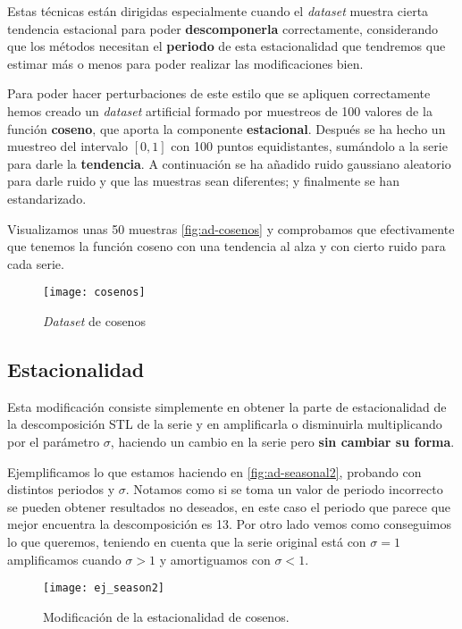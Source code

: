 Estas técnicas están dirigidas especialmente cuando el \emph{dataset} muestra cierta tendencia estacional para poder \textbf{descomponerla} correctamente, considerando que los métodos necesitan el \textbf{periodo} de esta estacionalidad que tendremos que estimar más o menos para poder realizar las modificaciones bien.

Para poder hacer perturbaciones de este estilo que se apliquen correctamente hemos creado un \emph{dataset} artificial formado por muestreos de 100 valores de la función \textbf{coseno}, que aporta la componente \textbf{estacional}. Después se ha hecho un muestreo del intervalo $[0, 1]$ con 100 puntos equidistantes, sumándolo a la serie para darle la \textbf{tendencia}. A continuación se ha añadido ruido gaussiano aleatorio para darle ruido y que las muestras sean diferentes; y finalmente se han estandarizado.

Visualizamos unas 50 muestras \autoref{fig:ad-cosenos} y comprobamos que efectivamente que tenemos la función coseno con una tendencia al alza y con cierto ruido para cada serie.

\begin{figure}[htpb]
  \centering
  \texttt{[image: cosenos]}
  \caption{\emph{Dataset} de cosenos}
  \label{fig:ad-cosenos}
\end{figure}

\subsection{Estacionalidad}

Esta modificación consiste simplemente en obtener la parte de estacionalidad de la descomposición STL de la serie y en amplificarla o disminuirla multiplicando por el parámetro $\sigma$, haciendo un cambio en la serie pero \textbf{sin cambiar su forma}.

Ejemplificamos lo que estamos haciendo en \autoref{fig:ad-seasonal2}, probando con distintos periodos y $\sigma$. Notamos como si se toma un valor de periodo incorrecto se pueden obtener resultados no deseados, en este caso el periodo que parece que mejor encuentra la descomposición es 13. Por otro lado vemos como conseguimos lo que queremos, teniendo en cuenta que la serie original está con $\sigma = 1$ amplificamos cuando $\sigma > 1$ y amortiguamos con $\sigma < 1$.

\begin{figure}[htpb]
  \centering
  \texttt{[image: ej\_season2]}
  \caption{Modificación de la estacionalidad de cosenos.}
  \label{fig:ad-seasonal2}
\end{figure}

